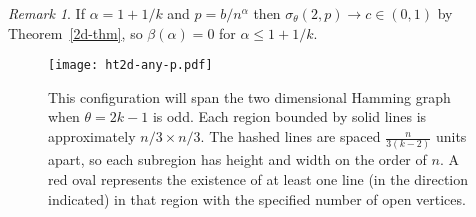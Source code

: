\documentclass{amsart}
\numberwithin{equation}{section}
\theoremstyle{definition}
\theoremstyle{remark}
\newtheorem{remark}[theorem]{Remark}
\begin{document}
\begin{remark} If $\alpha = 1+1/k$ and $p = b/n^\alpha$ then $\sigma_\theta(2,p) \to c \in(0,1)$ by Theorem~\ref{2d-thm}, so $\beta(\alpha) = 0$ for $\alpha \leq 1+1/k$.
\end{remark}

\begin{figure}[htd]
	\centering
	\texttt{[image: ht2d-any-p.pdf]}
	\caption{This configuration will span the two dimensional Hamming graph when $\theta = 2k-1$ is odd.  Each region bounded by solid lines is approximately $n/3 \times n/3$.  The hashed lines are spaced $\frac{n}{3(k-2)}$ units apart, so each subregion has height and width on the order of $n$.  A red oval represents the existence of at least one line (in the direction indicated) in that region with the specified number of open vertices.}
	\label{ht2d-any-p}
\end{figure}
\end{document}
